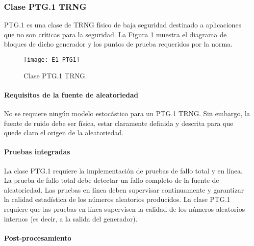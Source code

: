             \subsubsection{Clase PTG.1 TRNG}

                PTG.1 es una clase de TRNG físico de baja seguridad destinado a aplicaciones que no son críticas para la seguridad. La Figura \ref{fig:E1_PTG1} muestra el diagrama de bloques de dicho generador y los puntos de prueba requeridos por la norma.

                \begin{figure}[hbtp]
                    \caption{Clase PTG.1 TRNG.}
                    \centering
                    \texttt{[image: E1\_PTG1]}
                    \label{fig:E1_PTG1}
                \end{figure}

                \paragraph{Requisitos de la fuente de aleatoriedad\\}
                
                No se requiere ningún modelo estocástico para un PTG.1 TRNG. Sin embargo, la fuente de ruido debe ser física, estar claramente definida y descrita para que quede claro el origen de la aleatoriedad.
                
                \paragraph{Pruebas integradas\\}
                
                La clase PTG.1 requiere la implementación de pruebas de fallo total y en línea. La prueba de fallo total debe detectar un fallo completo de la fuente de aleatoriedad. Las pruebas en línea deben supervisar continuamente y garantizar la calidad estadística de los números aleatorios producidos. La clase PTG.1 requiere que las pruebas en línea supervisen la calidad de los números aleatorios internos (es decir, a la salida del generador).
                
                \paragraph{Post-procesamiento\\}
                
